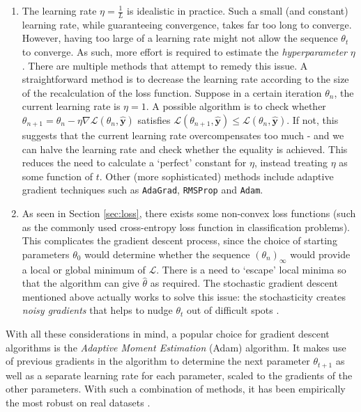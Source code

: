 \documentclass[a4paper,11pt,titlepage]{article}
\theoremstyle{definition}
\theoremstyle{plain}
\theoremstyle{remark}
\begin{document}
\begin{enumerate}
    \item The learning rate $\eta = \frac{1}{L}$ is idealistic in practice. Such a small (and constant) learning rate, while guaranteeing convergence, takes far too long to converge. However, having too large of a learning rate might not allow the sequence $\theta_t$ to converge. As such, more effort is required to estimate the \textit{hyperparameter} $\eta$. There are multiple methods that attempt to remedy this issue. A straightforward method is to decrease the learning rate according to the size of the recalculation of the loss function. Suppose in a certain iteration $\theta_n$, the current learning rate is $\eta = 1$. A possible algorithm is to check whether $\theta_{n+1} = \theta_n - \eta \nabla\mathcal{L}(\theta_n, \mathbf{\hat{y}})$ satisfies $\mathcal{L}(\theta_{n+1}, \mathbf{\hat{y}}) \leq \mathcal{L}(\theta_n, \mathbf{\hat{y}})$. If not, this suggests that the current learning rate overcompensates too much - and we can halve the learning rate and check whether the equality is achieved. This reduces the need to calculate a ‘perfect’ constant for $\eta$, instead treating $\eta$ as some function of $t$. Other (more sophisticated) methods include adaptive gradient techniques such as \texttt{AdaGrad}, \texttt{RMSProp} and \texttt{Adam}.

    \item As seen in Section \ref{sec:loss}, there exists some non-convex loss functions (such as the commonly used cross-entropy loss function in classification problems). This complicates the gradient descent process, since the choice of starting parameters $\theta_0$ would determine whether the sequence $(\theta_n)_\infty$ would provide a local or global minimum of $\mathcal{L}$. There is a need to ‘escape’ local minima so that the algorithm can give $\hat{\theta}$ as required. The stochastic gradient descent mentioned above actually works to solve this issue: the stochasticity creates \textit{noisy gradients} that helps to nudge $\theta_t$ out of difficult spots \cite{nazarathy2021}.
\end{enumerate}

With all these considerations in mind, a popular choice for gradient descent algorithms is the \textit{Adaptive Moment Estimation} (Adam) algorithm. It makes use of previous gradients in the algorithm to determine the next parameter $\theta_{t+1}$ as well as a separate learning rate for each parameter, scaled to the gradients of the other parameters. With such a combination of methods, it has been empirically the most robust on real datasets \cite{nazarathy2021}.
\end{document}
